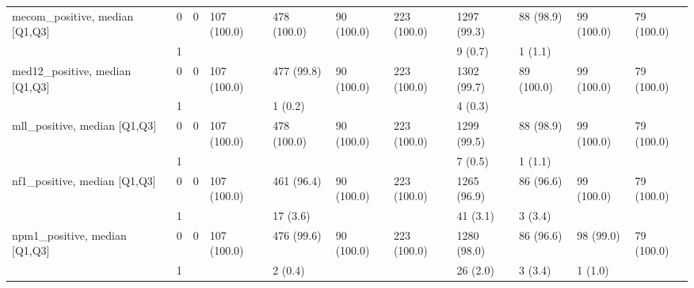 \begin{tabular}{lllllllllll}
mecom\_positive, median [Q1,Q3] & 0 &                    0 &         107 (100.0) &        478 (100.0) &           90 (100.0) &         223 (100.0) &       1297 (99.3) &         88 (98.9) &          99 (100.0) &           79 (100.0) \\
                 & 1 &                      &                     &                    &                      &                     &           9 (0.7) &           1 (1.1) &                     &                      \\
med12\_positive, median [Q1,Q3] & 0 &                    0 &         107 (100.0) &         477 (99.8) &           90 (100.0) &         223 (100.0) &       1302 (99.7) &        89 (100.0) &          99 (100.0) &           79 (100.0) \\
                 & 1 &                      &                     &            1 (0.2) &                      &                     &           4 (0.3) &                   &                     &                      \\
mll\_positive, median [Q1,Q3] & 0 &                    0 &         107 (100.0) &        478 (100.0) &           90 (100.0) &         223 (100.0) &       1299 (99.5) &         88 (98.9) &          99 (100.0) &           79 (100.0) \\
                 & 1 &                      &                     &                    &                      &                     &           7 (0.5) &           1 (1.1) &                     &                      \\
nf1\_positive, median [Q1,Q3] & 0 &                    0 &         107 (100.0) &         461 (96.4) &           90 (100.0) &         223 (100.0) &       1265 (96.9) &         86 (96.6) &          99 (100.0) &           79 (100.0) \\
                 & 1 &                      &                     &           17 (3.6) &                      &                     &          41 (3.1) &           3 (3.4) &                     &                      \\
npm1\_positive, median [Q1,Q3] & 0 &                    0 &         107 (100.0) &         476 (99.6) &           90 (100.0) &         223 (100.0) &       1280 (98.0) &         86 (96.6) &           98 (99.0) &           79 (100.0) \\
                 & 1 &                      &                     &            2 (0.4) &                      &                     &          26 (2.0) &           3 (3.4) &             1 (1.0) &                      \\

\end{tabular}
